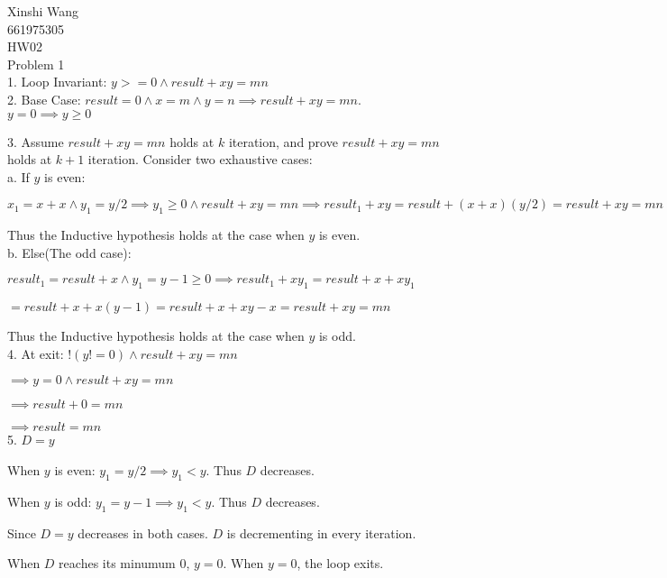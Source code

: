 \documentclass[12pt]{article}
\begin{document}
	\noindent Xinshi Wang\\
	661975305\\
	HW02\\
	
	\noindent Problem 1\\
	
	1. Loop Invariant: $y>=0 \land result + xy = mn$\\
	
	2. Base Case: $result = 0 \land x = m \land y = n \implies result + xy = mn$.\\
	$y = 0 \implies y \geq 0$
	
	3. Assume $result + xy = mn$ holds at $k$ iteration, and prove $result + xy = mn$ holds at $k+1$ iteration. Consider two exhaustive cases:\\
	
	a. If $y$ is even:
	
	$x_1 = x + x \land y_1 = y/2 \implies y_1 \geq 0 \land result + xy = mn \implies result_1 + xy = result + (x+x)(y/2) = result + xy = mn$
	
	Thus the Inductive hypothesis holds at the case when $y$ is even.\\
	
	b. Else(The odd case):
	
	$result_1 = result + x \land y_1 = y - 1 \geq 0 \implies result_1 + xy_1 = result + x + xy_1$

	 $= result + x + x(y-1) = result + x + xy - x = result + xy = mn$
	 
	Thus the Inductive hypothesis holds at the case when $y$ is odd.\\
	
	4. At exit: $!(y != 0) \land result + xy = mn$

		$\implies y = 0 \land result + xy = mn$ 
		
		$\implies result + 0 = mn$
		
		$\implies result = mn$\\
	
	5. $D = y$
	
	When $y$ is even: $y_1 = y/2 \implies y_1 < y$. Thus $D$ decreases.
	
	When $y$ is odd: $y_1 = y - 1 \implies y_1 < y$. Thus $D$ decreases.
	
	Since $D = y$ decreases in both cases. $D$ is decrementing in every iteration.
	
	When $D$ reaches its minumum $0$, $y = 0$. When $y = 0$, the loop exits.\\
	
\end{document}
